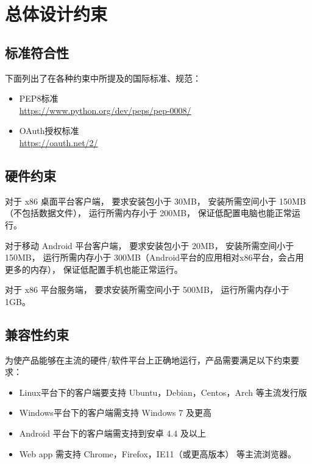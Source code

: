 \chapter{总体设计约束}

 
\section{标准符合性}
下面列出了在各种约束中所提及的国际标准、规范：
\begin{itemize}
    \item PEP8标准\\
    \url{https://www.python.org/dev/peps/pep-0008/}
    \item OAuth授权标准\\
    \url{https://oauth.net/2/}
\end{itemize}

\section{硬件约束}


对于 x86 桌面平台客户端，
要求安装包小于 30MB，
安装所需空间小于 150MB（不包括数据文件），
运行所需内存小于 200MB，
保证低配置电脑也能正常运行。

对于移动 Android 平台客户端，
要求安装包小于 20MB，
安装所需空间小于 150MB，
运行所需内存小于 300MB（Android平台的应用相对x86平台，会占用更多的内存），
保证低配置手机也能正常运行。

对于 x86 平台服务端，
要求安装所需空间小于 500MB，
运行所需内存小于 1GB。

\section{兼容性约束}
为使产品能够在主流的硬件/软件平台上正确地运行，产品需要满足以下约束要求：
\begin{itemize}
    \item Linux平台下的客户端要支持 Ubuntu，Debian，Centos，Arch 等主流发行版
    \item Windows平台下的客户端需支持 Windows 7 及更高
    \item Android 平台下的客户端需支持到安卓 4.4 及以上
    \item Web app 需支持 Chrome，Firefox，IE11（或更高版本） 等主流浏览器。
    \end{itemize}

